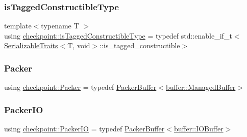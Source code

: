 \mbox{\label{namespacecheckpoint_abff0f367c546c94ce857d200153d990f}} 
\subsubsection{\texorpdfstring{is\+Tagged\+Constructible\+Type}{isTaggedConstructibleType}}
{\footnotesize\ttfamily template$<$typename T $>$ \\
using \hyperlink{namespacecheckpoint_abff0f367c546c94ce857d200153d990f}{checkpoint\+::is\+Tagged\+Constructible\+Type} = typedef std\+::enable\+\_\+if\+\_\+t$<$\hyperlink{structcheckpoint_1_1_serializable_traits}{Serializable\+Traits}$<$T, void$>$\+::is\+\_\+tagged\+\_\+constructible$>$}

\mbox{\label{namespacecheckpoint_ad744c208c7b1da6ee19c10d071e74f7d}} 
\subsubsection{\texorpdfstring{Packer}{Packer}}
{\footnotesize\ttfamily using \hyperlink{namespacecheckpoint_ad744c208c7b1da6ee19c10d071e74f7d}{checkpoint\+::\+Packer} = typedef \hyperlink{structcheckpoint_1_1_packer_buffer}{Packer\+Buffer}$<$\hyperlink{structcheckpoint_1_1buffer_1_1_managed_buffer}{buffer\+::\+Managed\+Buffer}$>$}

\mbox{\label{namespacecheckpoint_a0c8b3f2f174fd1076b410c7a2128919b}} 
\subsubsection{\texorpdfstring{Packer\+IO}{PackerIO}}
{\footnotesize\ttfamily using \hyperlink{namespacecheckpoint_a0c8b3f2f174fd1076b410c7a2128919b}{checkpoint\+::\+Packer\+IO} = typedef \hyperlink{structcheckpoint_1_1_packer_buffer}{Packer\+Buffer}$<$\hyperlink{structcheckpoint_1_1buffer_1_1_i_o_buffer}{buffer\+::\+I\+O\+Buffer}$>$}

\mbox{\label{namespacecheckpoint_a72c31e3d94e3b4d05bca5972bacc536a}} 
